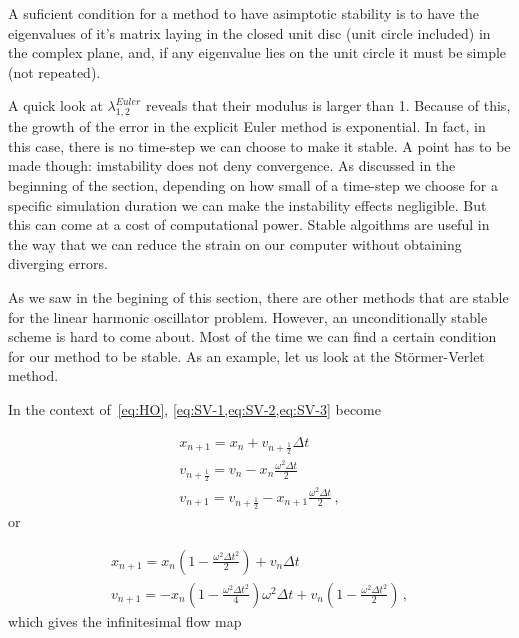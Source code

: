 \documentclass[12pt, class=report, crop=false]{standalone}
\begin{document}
\begin{theorem}
  A suficient condition for a method to have asimptotic stability is to have the eigenvalues of it's matrix laying in the closed unit disc (unit circle included) in the complex plane, and, if any eigenvalue lies on the unit circle it must be simple (not repeated).
\end{theorem}

A quick look at \(\lambda_{1,2}^{Euler}\) reveals that their modulus is larger than 1. Because of this, the growth of the error in the explicit Euler method is exponential. In fact, in this case, there is no time-step we can choose to make it stable. A point has to be made though: imstability does not deny convergence. As discussed in the beginning of the section, depending on how small of a time-step we choose for a specific simulation duration we can make the instability effects negligible. But this can come at a cost of computational power. Stable algoithms are useful in the way that we can reduce the strain on our computer without obtaining diverging errors.

As we saw in the begining of this section, there are other methods that are stable for the linear harmonic oscillator problem. However, an unconditionally stable scheme is hard to come about. Most of the time we can find a certain condition for our method to be stable. As an example, let us look at the Störmer-Verlet method.

In the context of~\cref{eq:HO}, \cref{eq:SV-1,eq:SV-2,eq:SV-3} become

\begin{subequations}
  \begin{align}
    x_{n+1} = x_n + v_{n+\frac{1}{2}} \Delta t\\
    v_{n+\frac{1}{2}} = v_{n} - x_n \frac{\omega^2 \Delta t}{2} \\
    v_{n+1} = v_{n+\frac{1}{2}} - x_{n+1} \frac{\omega^2 \Delta t}{2}\,,
  \end{align}
\end{subequations}
or

\begin{subequations}
  \begin{align}
    x_{n+1} = x_n \left( 1 - \frac{\omega^2 \Delta t^2}{2} \right) + v_n \Delta t\\
    v_{n+1} = - x_n \left(1 - \frac{\omega^2 \Delta t^2}{4}\right) \omega^2 \Delta t + v_n \left( 1 - \frac{\omega^2 \Delta t^2}{2} \right)\,,
  \end{align}
\end{subequations}
which gives the infinitesimal flow map
\end{document}
